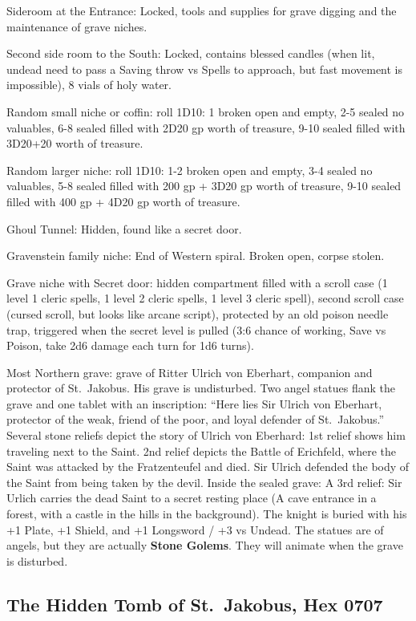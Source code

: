 \documentclass[
]{book}
\begin{document}
Sideroom at the Entrance: Locked, tools and supplies for grave digging and the maintenance of grave niches.

Second side room to the South: Locked, contains blessed candles (when lit, undead need to pass a Saving throw vs Spells to approach, but fast movement is impossible), 8 vials of holy water.

Random small niche or coffin: roll 1D10: 1 broken open and empty, 2-5 sealed no valuables, 6-8 sealed filled with 2D20 gp worth of treasure, 9-10 sealed filled with 3D20+20 worth of treasure.

Random larger niche: roll 1D10: 1-2 broken open and empty, 3-4 sealed no valuables, 5-8 sealed filled with 200 gp + 3D20 gp worth of treasure, 9-10 sealed filled with 400 gp + 4D20 gp worth of treasure.

Ghoul Tunnel: Hidden, found like a secret door.

Gravenstein family niche: End of Western spiral. Broken open, corpse stolen.

Grave niche with Secret door: hidden compartment filled with a scroll case (1 level 1 cleric spells, 1 level 2 cleric spells, 1 level 3 cleric spell), second scroll case (cursed scroll, but looks like arcane script), protected by an old poison needle trap, triggered when the secret level is pulled (3:6 chance of working, Save vs Poison, take 2d6 damage each turn for 1d6 turns).

Most Northern grave: grave of Ritter Ulrich von Eberhart, companion and protector of St.~Jakobus. His grave is undisturbed. Two angel statues flank the grave and one tablet with an inscription: ``Here lies Sir Ulrich von Eberhart, protector of the weak, friend of the poor, and loyal defender of St.~Jakobus.'' Several stone reliefs depict the story of Ulrich von Eberhard: 1st relief shows him traveling next to the Saint. 2nd relief depicts the Battle of Erichfeld, where the Saint was attacked by the Fratzenteufel and died. Sir Ulrich defended the body of the Saint from being taken by the devil. Inside the sealed grave: A 3rd relief: Sir Urlich carries the dead Saint to a secret resting place (A cave entrance in a forest, with a castle in the hills in the background). The knight is buried with his +1 Plate, +1 Shield, and +1 Longsword / +3 vs Undead. The statues are of angels, but they are actually \textbf{Stone Golems}. They will animate when the grave is disturbed.

\subsection{\texorpdfstring{The Hidden Tomb of St.~Jakobus, \textbf{Hex 0707}}{The Hidden Tomb of St.~Jakobus, Hex 0707}}\label{the-hidden-tomb-of-st.-jakobus-hex-0707}
\end{document}
